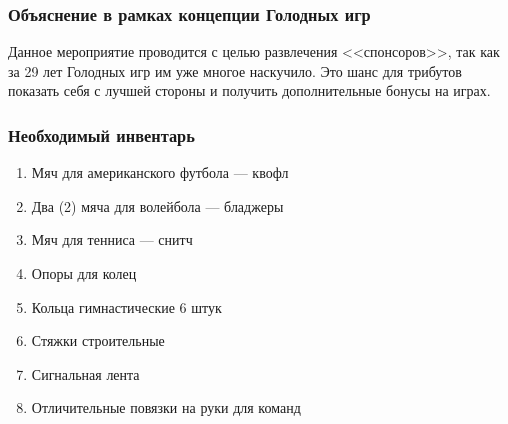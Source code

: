 
\subsubsection*{Объяснение в рамках концепции Голодных игр}
\par Данное мероприятие проводится с целью развлечения <<спонсоров>>, так как за 29 лет Голодных игр им уже многое наскучило. Это шанс для трибутов показать себя с лучшей стороны и получить дополнительные бонусы на играх.

\subsubsection*{Необходимый инвентарь}
\begin{enumerate}
\item Мяч для американского футбола --- квофл
\item Два (2) мяча для волейбола --- бладжеры
\item Мяч для тенниса --- снитч
\item Опоры для колец
\item Кольца гимнастические 6 штук
\item Стяжки строительные
\item Сигнальная лента
\item Отличительные повязки на руки для команд
\end{enumerate}